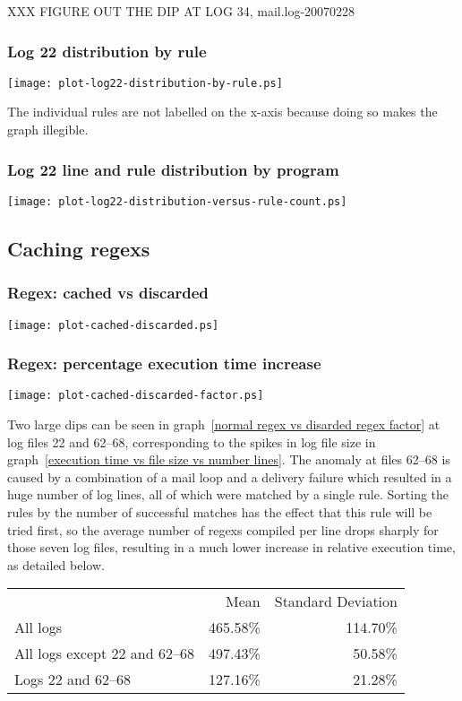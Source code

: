 \documentclass[a4paper,12pt,draft]{article}
\begin{document}
XXX FIGURE OUT THE DIP AT LOG 34, mail.log-20070228

\subsubsection{Log 22 distribution by rule}
\label{log22 distribution by rule}
\texttt{[image: plot-log22-distribution-by-rule.ps]}

The individual rules are not labelled on the x-axis because doing so makes
the graph illegible.

\subsubsection{Log 22 line and rule distribution by program}
\label{log22 line and rule distribution by program}
\texttt{[image: plot-log22-distribution-versus-rule-count.ps]}




\subsection{Caching regexs}

\subsubsection{Regex: cached vs discarded}
\label{normal regex vs discard regex}
\texttt{[image: plot-cached-discarded.ps]}

\subsubsection{Regex: percentage execution time increase}
\label{normal regex vs disarded regex factor}
\texttt{[image: plot-cached-discarded-factor.ps]}

Two large dips can be seen in graph~\ref{normal regex vs disarded regex
factor} at log files 22 and 62--68, corresponding to the spikes in log file
size in graph~\ref{execution time vs file size vs number lines}.  The
anomaly at files 62--68 is caused by a combination of a mail loop and a
delivery failure which resulted in a huge number of log lines, all of which
were matched by a single rule.  Sorting the rules by the number of
successful matches has the effect that this rule will be tried first, so
the average number of regexs compiled per line drops sharply for those
seven log files, resulting in a much lower increase in relative execution
time, as detailed below.

\begin{tabular}[]{lrr}
                                    & Mean      & Standard Deviation    \\
    All logs                        & 465.58\%  & 114.70\%              \\
    All logs except 22 and 62--68   & 497.43\%  & 50.58\%               \\
    Logs 22 and 62--68              & 127.16\%  & 21.28\%               \\

\end{tabular}
\end{document}
